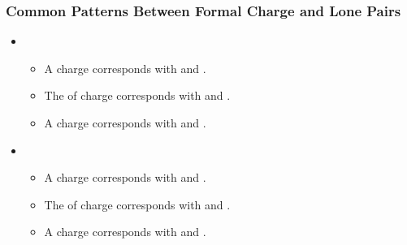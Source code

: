 \begin{itemize}
  \subsubsection{Common Patterns Between Formal Charge and Lone Pairs}
    \begin{itemize}
        \item {}
            \begin{itemize}
                \item A  charge corresponds with  and .
                \item The  of charge corresponds with  and .
                \item A  charge corresponds with  and .
            \end{itemize}
        \item {}
            \begin{itemize}
                \item A  charge corresponds with  and .
                \item The  of charge corresponds with  and .
                \item A  charge corresponds with  and .
            \end{itemize}
    \end{itemize}


\end{itemize}

